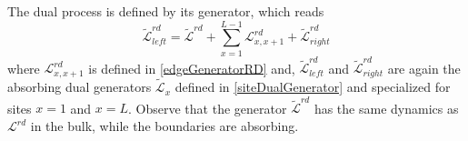 \documentclass[10pt]{article}
\numberwithin{equation}{section}
\numberwithin{equation}{subsection}
\begin{document}
The dual process is defined by its generator, which reads
\begin{equation}\label{DualGeneratorRD}
	\widetilde{\mathcal{L}}_{left}^{rd}=\widetilde{\mathcal{L}}^{rd}+\sum_{x=1}^{L-1}\mathcal{L}_{x,x+1}^{rd}+\widetilde{\mathcal{L}}_{right}^{rd}
\end{equation}
where 
$\mathcal{L}_{x,x+1}^{rd}$ is defined in \eqref{edgeGeneratorRD} and, $\widetilde{\mathcal{L}}_{left}^{rd}$ and $\widetilde{\mathcal{L}}_{right}^{rd}$ are again the absorbing dual generators $\widetilde{\mathcal{L}}_{x}$ defined in \eqref{siteDualGenerator} and specialized for sites $x=1$ and $x=L$. 
Observe that the generator $\widetilde{\mathcal{L}}^{rd}$ has the same dynamics as $\mathcal{L}^{rd}$ in the bulk, while the boundaries are absorbing. 
\end{document}
